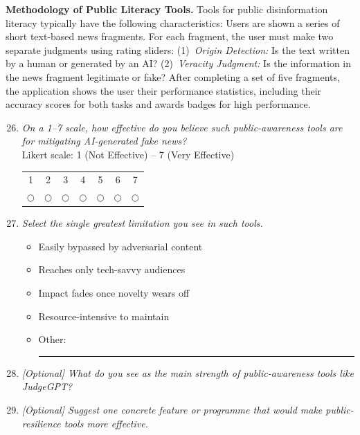 \medskip
\noindent\textbf{Methodology of Public Literacy Tools.}
Tools for public disinformation literacy typically have the following characteristics: Users are shown a series of short text-based news fragments. For each fragment, the user must make two separate judgments using rating sliders: (1)~\textit{Origin Detection:} Is the text written by a human or generated by an AI? (2)~\textit{Veracity Judgment:} Is the information in the news fragment legitimate or fake? After completing a set of five fragments, the application shows the user their performance statistics, including their accuracy scores for both tasks and awards badges for high performance.

\begin{enumerate}[label=\textbf{Q\arabic*.}, leftmargin=3em]
\setcounter{enumi}{25}

    \item \textit{On a 1--7 scale, how effective do you believe such public-awareness tools are for mitigating AI-generated fake news?}\\[2pt]
    \noindent Likert scale: 1 (Not Effective) -- 7 (Very Effective)\\
    \begin{tabular}{ccccccc}
    1 & 2 & 3 & 4 & 5 & 6 & 7 \\
    $\bigcirc$ & $\bigcirc$ & $\bigcirc$ & $\bigcirc$ & $\bigcirc$ & $\bigcirc$ & $\bigcirc$
    \end{tabular}

    \item[*] \textit{Select the single greatest limitation you see in such tools.}
    \begin{itemize}
        \item[$\bigcirc$] Easily bypassed by adversarial content
        \item[$\bigcirc$] Reaches only tech-savvy audiences
        \item[$\bigcirc$] Impact fades once novelty wears off
        \item[$\bigcirc$] Resource-intensive to maintain
        \item[$\bigcirc$] Other: \rule{5cm}{0.4pt}
    \end{itemize}

    \item \textit{[Optional] What do you see as the main strength of public-awareness tools like JudgeGPT?}\\[2pt]
    \framebox[\linewidth]{\rule{0pt}{2em}}

    \item \textit{[Optional] Suggest one concrete feature or programme that would make public-resilience tools more effective.}\\[2pt]
    \framebox[\linewidth]{\rule{0pt}{2em}}

\end{enumerate}

